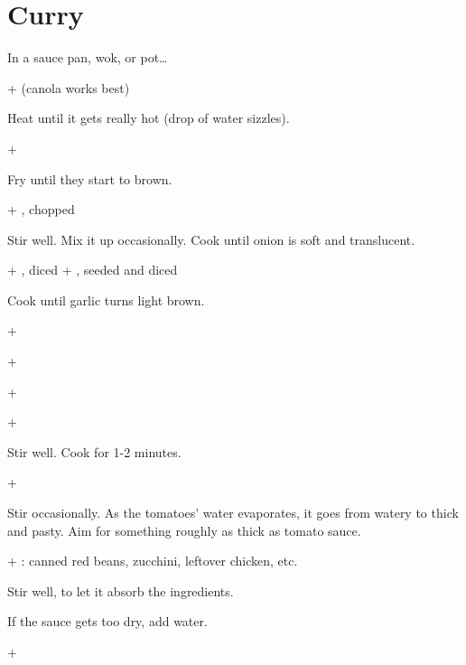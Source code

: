 \section{Curry}

In a sauce pan, wok, or pot\ldots

+  (canola works best)

Heat until it gets really hot (drop of water sizzles).

+ 

Fry until they start to brown.

+ , chopped

Stir well. Mix it up occasionally.
Cook until onion is soft and translucent.

+ , diced
+ , seeded and diced

Cook until garlic turns light brown.

+ 

+ 

+ 

+ 

Stir well. Cook for 1-2 minutes.

+ 

Stir occasionally. As the tomatoes' water evaporates,
it goes from watery to thick and pasty.
Aim for something roughly as thick as tomato sauce.

+ :
  canned red beans, zucchini, leftover chicken, etc.

Stir well, to let it absorb the ingredients.

If the sauce gets too dry, add water.

+ 
